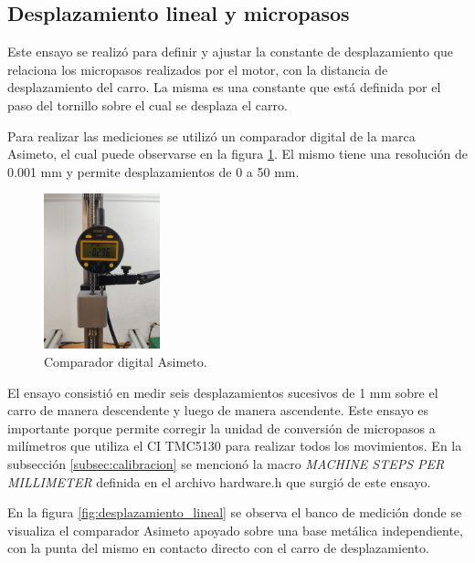\subsection{Desplazamiento lineal y micropasos}

Este ensayo se realizó para definir y ajustar la constante de desplazamiento que relaciona los micropasos realizados por el motor, con la distancia de desplazamiento del carro. La misma es una constante que está definida por el paso del tornillo sobre el cual se desplaza el carro.

Para realizar las mediciones se utilizó un comparador digital de la marca Asimeto\citep{web_asimeto}, el cual puede observarse en la figura \ref{fig:micrometro}. El mismo tiene una resolución de 0.001 mm y permite desplazamientos de 0 a 50 mm.


\begin{figure}[h!]
\centering 
\includegraphics[width=0.3\textwidth]{./Figures/micrometro.png}
\caption{Comparador digital Asimeto.}
\label{fig:micrometro}
\end{figure}

El ensayo consistió en medir seis desplazamientos sucesivos de 1 mm sobre el carro de manera descendente y luego de manera ascendente. Este ensayo es importante porque permite corregir la unidad de conversión de micropasos a milímetros que utiliza el CI TMC5130 para realizar todos los movimientos. 
En la subsección \ref{subsec:calibracion} se mencionó la macro \textit{MACHINE STEPS PER MILLIMETER} definida en el archivo hardware.h que surgió de este ensayo. 

En la figura \ref{fig:desplazamiento_lineal} se observa el banco de medición donde se visualiza el comparador Asimeto apoyado sobre una base metálica independiente, con la punta del mismo en contacto directo con el carro de desplazamiento.

